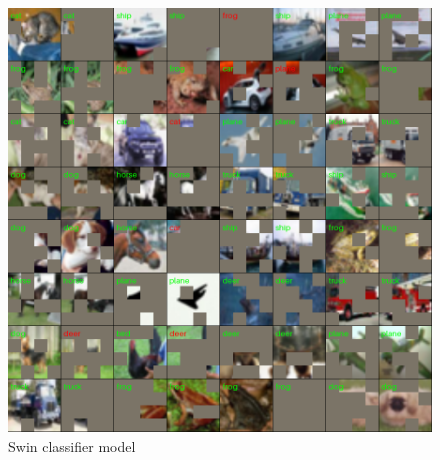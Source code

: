 \documentclass[magisterska,en]{pracamgr}
\begin{document}
\begin{figure}[H]
\centering
\includegraphics[scale=0.5]{./images/swin_classifier_masks.png}
\caption{Swin classifier model}
\label{swin_classifier_masks}
\end{figure}




\fi


















\printbibliography
\end{document}
